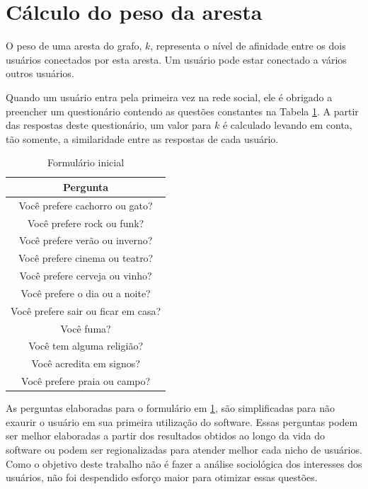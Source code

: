 \FloatBarrier



\section{Cálculo do peso da aresta}
O peso de uma aresta do grafo, $k$, representa o nível de afinidade entre os dois usuários conectados por esta aresta. Um usuário pode estar conectado a vários outros usuários.

Quando um usuário entra pela primeira vez na rede social, ele é obrigado a preencher um questionário contendo as questões constantes na Tabela \ref{tab:questoes}. A partir das respostas deste questionário, um valor para $k$ é calculado levando em conta, tão somente, a similaridade entre as respostas de cada usuário.

\begin{table}[!htp]
\centering
\caption{Formulário inicial}
\label{tab:questoes}
\begin{tabular}{ | c |}
\hline
Pergunta\\
\hline
\hline
Você prefere cachorro ou gato?\\  
\hline
Você prefere rock ou funk?\\
\hline
Você prefere verão ou inverno? \\
\hline
Você prefere cinema ou teatro?\\
\hline
Você prefere cerveja ou vinho?\\
\hline
Você prefere o dia ou a noite?\\
\hline
Você prefere sair ou ficar em casa?\\
\hline
Você fuma?\\
\hline
Você tem alguma religião?\\
\hline
Você acredita em signos?\\
\hline
Você prefere praia ou campo?\\
\hline
\end{tabular}
\end{table}

As perguntas elaboradas para o formulário em \ref{tab:questoes}, são simplificadas para não exaurir o usuário em sua primeira utilização do software. Essas perguntas podem ser melhor elaboradas a partir dos resultados obtidos ao longo da vida do software ou podem ser regionalizadas para atender melhor cada nicho de usuários. Como o objetivo deste trabalho não é fazer a análise sociológica dos interesses dos usuários, não foi despendido esforço maior para otimizar essas questões.

